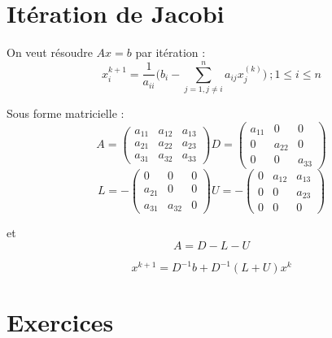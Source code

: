 \documentclass[11pt,a4paper]{report}
\begin{document}
\section{Itération de Jacobi}
On veut résoudre $Ax=b$ par itération :
$$
x_i^{k+1} = \frac{1}{a_{ii}} \Big( b_i - \sum_{j=1,j\neq i}^n a_{ij}x_j^{(k)} \Big) \ ; 1\leq i \leq n
$$

Sous forme matricielle :
$$
A = \begin{pmatrix}
a_{11} & a_{12} & a_{13} \\
a_{21} & a_{22} & a_{23} \\
a_{31} & a_{32} & a_{33}
\end{pmatrix}
D = \begin{pmatrix}
a_{11} & 0 & 0 \\
0 & a_{22} & 0 \\
0 & 0 & a_{33}
\end{pmatrix}
$$
$$
L = -\begin{pmatrix}
0&0&0 \\
a_{21} & 0&0 \\
a_{31} & a_{32} &0
\end{pmatrix}
U = -\begin{pmatrix}
0 & a_{12} & a_{13} \\
0 & 0 & a_{23} \\
0&0&0
\end{pmatrix}
$$

et
$$
A = D - L - U
$$

$$
x^{k+1} = D^{-1}b+D^{-1}(L+U)x^k
$$

\section{Exercices}
\end{document}
